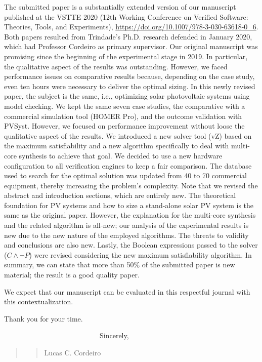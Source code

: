 \documentclass[11pt]{article}
\newcommand\vi{\vspace{\baselineskip}}
\begin{document}
The submitted paper is a substantially extended version of our
manuscript published at the VSTTE 2020 (12th Working Conference on Verified Software: Theories, Tools, and Experiments), \url{https://doi.org/10.1007/978-3-030-63618-0_6}.
Both papers resulted from Trindade's Ph.D. research defended in January 2020, which had Professor Cordeiro as primary supervisor.
Our original manuscript was promising since the beginning of the experimental stage in 2019. In particular, the qualitative aspect of the results was outstanding. However, we faced performance issues on comparative results because, depending on the case study, even ten hours were necessary to deliver the optimal sizing. In this newly revised paper, the subject is the same, i.e., optimizing solar photovoltaic systems using model checking. We kept the same seven case studies, the comparative with a commercial simulation tool (HOMER Pro), and the outcome validation with PVSyst. However, we focused on performance improvement without loose the qualitative aspect of the results. We introduced a new solver tool (vZ) based on the maximum satisfiability and a new algorithm specifically to deal with multi-core synthesis to achieve that goal. We decided to use a new hardware configuration to all verification engines to keep a fair comparison. The database used to search for the optimal solution was updated from 40 to 70 commercial equipment, thereby increasing the problem's complexity. Note that we revised the abstract and introduction sections, which are entirely new. The theoretical foundation for PV systems and how to size a stand-alone solar PV system is the same as the original paper. However, the explanation for the multi-core synthesis and the related algorithm is all-new; our analysis of the experimental results is new due to the new nature of the employed algorithms. The threats to validity and conclusions are also new. 
Lastly, the Boolean expressions passed to the solver ($C \wedge \neg P$) were revised considering the new maximum satisfiability algorithm. In summary, we can state that more than 50\% of the submitted paper is new material; the result is a good quality paper.

We expect that our manuscript can be evaluated in this respectful journal with this contextualization.


\vi
Thank you for your time.
\vi


\indent
~~~~~~~~~~~~~~~~~~~~~~~~~~~Sincerely,\\



\begin{quote}
\begin{quote}
\begin{flushright}



Lucas C. Cordeiro~~~~~~~
\end{flushright}
\end{quote}
\end{quote}


 
 
\end{document}
